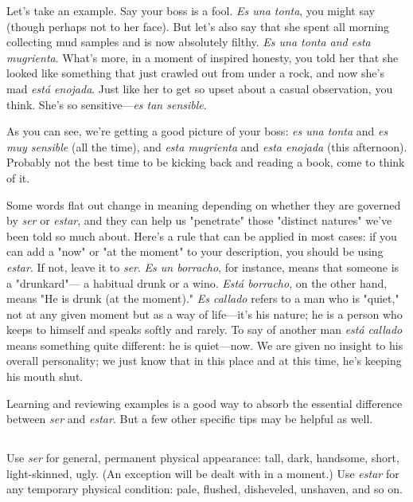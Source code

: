 \documentclass[14pt,a4paper,oneside]{memoir}
\begin{document}
Let's take an example. Say your boss is a fool. \emph{Es una tonta},
you might say (though perhaps not to her face). But let's also say that
she spent all morning collecting mud samples and is now absolutely
filthy. \emph{Es una tonta and esta mugrienta}. What's more, in a moment of
inspired honesty, you told her that she looked like something that just
crawled out from under a rock, and now she's mad \emph{está enojada}. Just
like her to get so upset about a casual observation, you think. She's so
sensitive---\emph{es tan sensible}.

As you can see, we're getting a good picture of your boss: \emph{es
una tonta} and \emph{es muy sensible} (all the time), and \emph{esta mugrienta} and
\emph{esta enojada} (this afternoon). Probably not the best time to be kicking
back and reading a book, come to think of it.

Some words flat out change in meaning depending on whether
they are governed by \emph{ser} or \emph{estar}, and they can help us "penetrate"
those "distinct natures" we've been told so much about. Here's a rule
that can be applied in most cases: if you can add a "now" or "at the moment" to your description, you should be using \emph{estar}. If not, leave it to
\emph{ser}. \emph{Es un borracho}, for instance, means that someone is a "drunkard"---
a habitual drunk or a wino. \emph{Está borracho}, on the other hand, means
"He is drunk (at the moment)." \emph{Es callado} refers to a man who is
"quiet," not at any given moment but as a way of life---it's his nature;
he is a person who keeps to himself and speaks softly and rarely. To say
of another man \emph{está callado} means something quite different: he is
quiet---now. We are given no insight to his overall personality; we just
know that in this place and at this time, he's keeping his mouth shut.

Learning and reviewing examples is a good way to absorb the
essential difference between \emph{ser} and \emph{estar}. But a few other specific tips
may be helpful as well.

\subsection{}

Use \emph{ser} for general, permanent physical appearance: tall,
dark, handsome, short, light-skinned, ugly. (An exception will be dealt
with in a moment.) Use \emph{estar} for any temporary physical condition:
pale, flushed, disheveled, unshaven, and so on.
\end{document}
